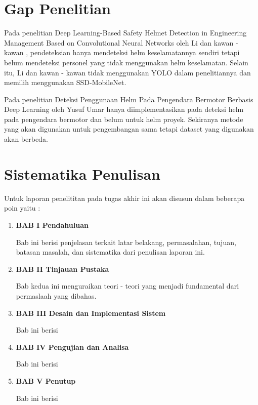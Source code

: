 \section{Gap Penelitian}
Pada penelitian Deep Learning-Based Safety Helmet Detection in Engineering Management Based on Convolutional Neural Networks oleh Li dan kawan - kawan , pendeteksian hanya mendeteksi helm keselamatannya sendiri tetapi belum mendeteksi personel yang tidak menggunakan helm keselamatan. Selain itu, Li dan kawan - kawan tidak menggunakan YOLO dalam penelitiannya dan memilih menggunakan SSD-MobileNet.
\par Pada penelitian Deteksi Penggunaan Helm Pada Pengendara Bermotor Berbasis Deep Learning oleh Yusuf Umar hanya diimplementasikan pada deteksi helm pada pengendara bermotor dan belum untuk helm proyek. Sekiranya metode yang akan digunakan untuk pengembangan sama tetapi dataset yang digunakan akan berbeda.

\section{Sistematika Penulisan}
\label{sec:sistematikapenulisan}

Untuk laporan penelititan pada tugas akhir ini akan disusun dalam beberapa poin yaitu :

\begin{enumerate}[nolistsep]

  \item \textbf{BAB I Pendahuluan}

  Bab ini berisi penjelasan terkait latar belakang, permasalahan, tujuan, batasan masalah, dan sistematika dari penulisan laporan ini.

  \vspace{2ex}

  \item \textbf{BAB II Tinjauan Pustaka}

  Bab kedua ini menguraikan teori - teori yang menjadi fundamental dari permaslaah yang dibahas.

  \vspace{2ex}

  \item \textbf{BAB III Desain dan Implementasi Sistem}

  Bab ini berisi \lipsum[4][1-5]

  \vspace{2ex}

  \item \textbf{BAB IV Pengujian dan Analisa}

  Bab ini berisi \lipsum[5][1-5]

  \vspace{2ex}

  \item \textbf{BAB V Penutup}

  Bab ini berisi \lipsum[6][1-5]

\end{enumerate}
